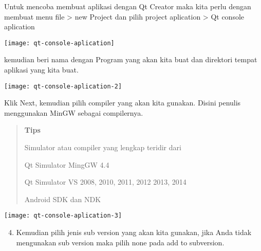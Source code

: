   Untuk mencoba membuat aplikasi dengan Qt Creator maka kita perlu
  dengan membuat menu file \textgreater{} new Project dan pilih project
  aplication \textgreater{} Qt console aplication

  \begin{center}

  \texttt{[image: qt-console-aplication]}

  \end{center}

  kemudian beri nama dengan Program yang akan kita buat dan direktori
  tempat aplikasi yang kita buat.

  \begin{center}

  \texttt{[image: qt-console-aplication-2]}

  \end{center}

  Klik Next, kemudian pilih compiler yang akan kita gunakan. Disini
  penulis menggunakan MinGW sebagai compilernya.


\begin{quotation}
{\LARGE {}}	\textbf{Tips}
	
	Simulator 	 atau compiler yang lengkap teridir dari
	
	\begin{dinglist}{51}
		
		\item
		Qt Simulator MingGW 4.4
		\item
		Qt Simulator VS 2008, 2010, 2011, 2012 2013, 2014
		\item
		Android SDK dan NDK
	\end{dinglist}
\end{quotation}




\begin{center}

\texttt{[image: qt-console-aplication-3]}

\end{center}

\begin{enumerate}

\setcounter{enumi}{3}

\item
  Kemudian pilih jenis sub version yang akan kita gunakan, jika Anda
  tidak mengunakan sub version maka pilih none pada add to subversion.
\end{enumerate}


